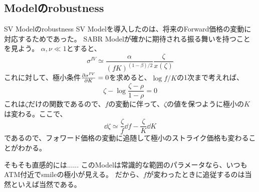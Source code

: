 \documentclass[dvipdfmx,9pt]{beamer}
\begin{document}
\subsection{Modelのrobustness}
\begin{frame}{SV Modelのrobustness}
  SV Modelを導入したのは、将来のForward価格の変動に対応するためであった。
  SABR Modelが確かに期待される振る舞いを持つことを見よう。
  $\alpha,\nu \ll 1$とすると、
  \begin{equation}
    \sigma^{IV} \simeq \frac{\alpha}{(fK)^{(1-\beta)/2}}\frac{\zeta}{x(\zeta)}
  \end{equation}
  これに対して、極小条件$\pdv{\sigma^{IV}}{K} = 0$を求めると、$\log f/K$の1次まで考えれば、
  \begin{equation}
    \zeta - \log \frac{\zeta - \rho}{1 - \rho} = 0
  \end{equation}
  これは$\zeta$だけの関数であるので、$f$の変動に伴って、$\zeta$の値を保つように極小の$K$は変わる。ここで、
  \begin{equation}
    \dd \zeta \simeq \frac{\zeta}{f} \dd f - \frac{\zeta}{K} \dd K
  \end{equation}
  であるので、フォワード価格の変動に追随して極小のストライク価格も変わることがわかる。
  \begin{alertblock}{そもそも直感的には......}
    このModelは常識的な範囲のパラメータなら、いつもATM付近でsmileの極小が見える。
    だから、$f$が変わったときに追従するのは当然といえば当然である。
  \end{alertblock}
\end{frame}
\end{document}
